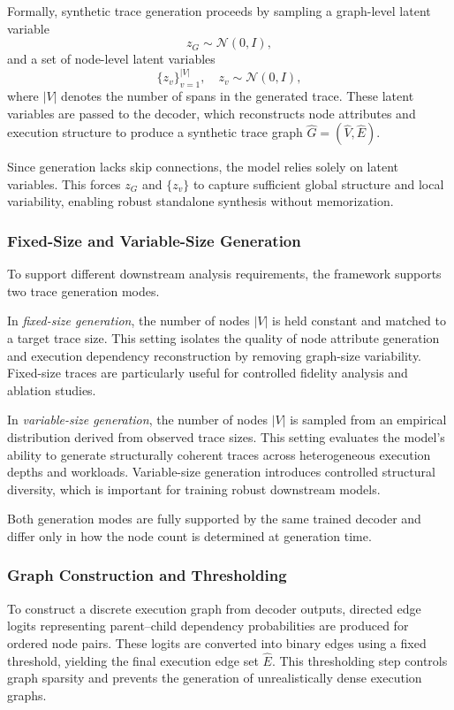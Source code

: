 \documentclass[sigconf,review]{acmart}
\begin{document}
Formally, synthetic trace generation proceeds by sampling a graph-level latent variable
\[
z_G \sim \mathcal{N}(0, I),
\]
and a set of node-level latent variables
\[
\{z_v\}_{v=1}^{|V|}, \quad z_v \sim \mathcal{N}(0, I),
\]
where $|V|$ denotes the number of spans in the generated trace. These latent variables are passed to the decoder, which reconstructs node attributes and execution structure to produce a synthetic trace graph $\hat{G} = (\hat{V}, \hat{E})$.

Since generation lacks skip connections, the model relies solely on latent variables. This forces $z_G$ and $\{z_v\}$ to capture sufficient global structure and local variability, enabling robust standalone synthesis without memorization.

\subsubsection{Fixed-Size and Variable-Size Generation}

To support different downstream analysis requirements, the framework supports two trace generation modes.

In \emph{fixed-size generation}, the number of nodes $|V|$ is held constant and matched to a target trace size. This setting isolates the quality of node attribute generation and execution dependency reconstruction by removing graph-size variability. Fixed-size traces are particularly useful for controlled fidelity analysis and ablation studies.

In \emph{variable-size generation}, the number of nodes $|V|$ is sampled from an empirical distribution derived from observed trace sizes. This setting evaluates the model’s ability to generate structurally coherent traces across heterogeneous execution depths and workloads. Variable-size generation introduces controlled structural diversity, which is important for training robust downstream models.

Both generation modes are fully supported by the same trained decoder and differ only in how the node count is determined at generation time.

\subsubsection{Graph Construction and Thresholding}

To construct a discrete execution graph from decoder outputs, directed edge logits representing parent--child dependency probabilities are produced for ordered node pairs. These logits are converted into binary edges using a fixed threshold, yielding the final execution edge set $\hat{E}$. This thresholding step controls graph sparsity and prevents the generation of unrealistically dense execution graphs.
\end{document}
